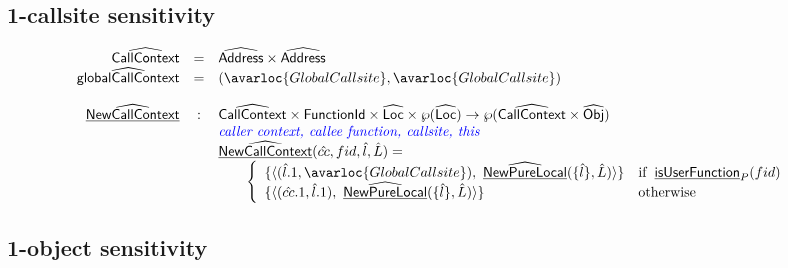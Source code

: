 \subsection{1-callsite sensitivity}
\[
\begin{array}{rcl}
\abs{CallContext} & = & \abs{Address} \times \abs{Address} \\
\abs{globalCallContext} & = & (\avarloc{GlobalCallsite}, \avarloc{GlobalCallsite}) \\
\\

\ahf{NewCallContext} & : & \abs{CallContext} \times \SF{FunctionId} \times \abs{Loc} \times \powerset{\abs{Loc}} \rightarrow \powerset{\abs{CallContext} \times \abs{Obj}} \\
& & \comment{\inblue caller context, callee function, callsite, this}  \\
& & \ahf{NewCallContext}(\hat{cc}, fid, \hat{l}, \hat{L}) = \\
& & \quad\quad \left\{
       \begin{array}{ll}
         \{ \langle (\hat{l}.1, \avarloc{GlobalCallsite}), ~ \ahf{NewPureLocal}(\{\hat{l}\}, \hat{L}) \rangle \} & \ifc{\chf{isUserFunction}_P(fid)} \\
         \{ \langle (\hat{cc}.1, \hat{l}.1), ~ \ahf{NewPureLocal}(\{\hat{l}\}, \hat{L}) \rangle \} & \owc \\
       \end{array}
     \right.\\
\end{array}
\]


\subsection{1-object sensitivity}

